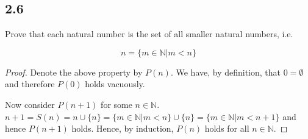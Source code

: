 \subsection*{2.6} Prove that each natural number is the set of all smaller natural numbers, i.e.

$$ n = \{m \in \mathbb{N}| m < n\}$$

\begin{proof}
Denote the above property by $P(n)$. We have, by definition, that $0 = \emptyset$ and therefore $P(0)$ holds vacuously.

Now consider $P(n+1)$ for some $n \in \mathbb{N}$. $n+1 = S(n) = n \cup \{n\} = \{m \in \mathbb{N}| m < n\} \cup \{n\} = \{m \in \mathbb{N}| m < n+1\}$ and hence $P(n+1)$ holds. Hence, by induction, $P(n)$ holds for all $n \in \mathbb{N}$.
\end{proof}

